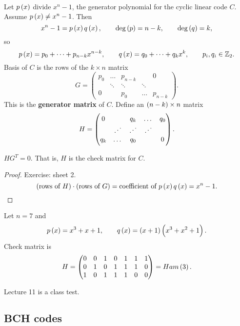 Let $ p\br{x} $ divide $ x^n - 1 $, the generator polynomial for the cyclic linear code $ C $. Assume $ p\br{x} \ne x^n - 1 $. Then
$$ x^n - 1 = p\br{x}q\br{x}, \qquad \deg\br{p} = n - k, \qquad \deg\br{q} = k, $$
so
$$ p\br{x} = p_0 + \dots + p_{n - k}x^{n - k}, \qquad q\br{x} = q_0 + \dots + q_kx^k, \qquad p_i, q_i \in \Z_2. $$
Basis of $ C $ is the rows of the $ k \times n $ matrix
$$ G =
\begin{pmatrix}
p_0 & \dots & p_{n - k} & & 0 \\
& \ddots & \ddots & \ddots & \\
0 & & p_0 & \dots & p_{n - k}
\end{pmatrix}.
$$
This is the \textbf{generator matrix} of $ C $. Define an $ \br{n - k} \times n $ matrix
$$ H =
\begin{pmatrix}
0 & & q_k & \dots & q_0 \\
& \reflectbox{$ \ddots $} & \reflectbox{$ \ddots $} & \reflectbox{$ \ddots $} & \\
q_k & \dots & q_0 & & 0
\end{pmatrix}.
$$

\begin{proposition}
$ HG^T = 0 $. That is, $ H $ is the check matrix for $ C $.
\end{proposition}

\begin{proof}
Exercise: sheet 2.
$$ \br{\text{rows of} \ H} \cdot \br{\text{rows of} \ G} = \text{coefficient of} \ p\br{x}q\br{x} = x^n - 1. $$
\end{proof}

\begin{example*}
Let $ n = 7 $ and
$$ p\br{x} = x^3 + x + 1, \qquad q\br{x} = \br{x + 1}\br{x^3 + x^2 + 1}. $$
Check matrix is
$$ H =
\begin{pmatrix}
0 & 0 & 1 & 0 & 1 & 1 & 1 \\
0 & 1 & 0 & 1 & 1 & 1 & 0 \\
1 & 0 & 1 & 1 & 1 & 0 & 0
\end{pmatrix}
= Ham\br{3}. $$
\end{example*}


Lecture 11 is a class test.

\pagebreak

\subsection{BCH codes}

